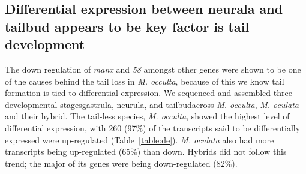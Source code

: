 \subsection{Differential expression between neurala and tailbud appears to be key factor is tail development} 

\begin{table}[b]
\caption{Differential expression: Species \textit{vs} time}
\end{table}

The down regulation of \textit{manx} and \textit{58} amongst other genes were shown to be one of the causes behind the tail loss in \textit{M. occulta}, because of this we know tail formation is tied to differential expression. We sequenced and assembled three developmental stages\textemdash gastrula, neurula, and tailbud\textemdash across \textit{M. occulta}, \textit{M. oculata} and their hybrid. The tail-less species, \textit{M. occulta}, showed the highest level of differential expression, with 260 (97\%) of the transcripts said to be differentially expressed were up-regulated (Table~\ref{table:de}). \textit{M. oculata} also had more transcripts being up-regulated (65\%) than down. Hybrids did not follow this trend; the major of its genes were being down-regulated (82\%).  


